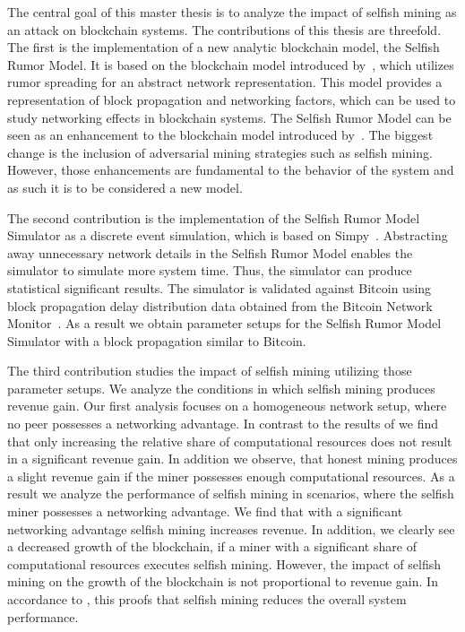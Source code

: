 The central goal of this master thesis is to analyze the impact of selfish mining as an attack on blockchain systems. The contributions of this thesis are threefold. The first is the implementation of a new analytic blockchain model, the Selfish Rumor Model. It is based on the blockchain model introduced by~, which utilizes rumor spreading for an abstract network representation. This model provides a representation of block propagation and networking factors, which can be used to study networking effects in blockchain systems. The Selfish Rumor Model can be seen as an enhancement to the blockchain model introduced by~. The biggest change is the inclusion of adversarial mining strategies such as selfish mining. However, those enhancements are fundamental to the behavior of the system and as such it is to be considered a new model.

The second contribution is the implementation of the Selfish Rumor Model Simulator as a discrete event simulation, which is based on Simpy~\cite{simpy}.
Abstracting away unnecessary network details in the Selfish Rumor Model enables the simulator to simulate more system time. Thus, the simulator can produce statistical significant results. The simulator is validated against Bitcoin using block propagation delay distribution data obtained from the Bitcoin Network Monitor~\cite{BitcoinNetworkMonitor}. As a result we obtain parameter setups for the Selfish Rumor Model Simulator with a block propagation similar to Bitcoin.

The third contribution studies the impact of selfish mining utilizing those parameter setups. We analyze the conditions in which selfish mining produces revenue gain. Our first analysis focuses on a homogeneous network setup, where no peer possesses a networking advantage. In contrast to the results of \citeauthor{eyal} we find that only increasing the relative share of computational resources does not result in a significant revenue gain. In addition we observe, that honest mining produces a slight revenue gain if the miner possesses enough computational resources.
As a result we analyze the performance of selfish mining in scenarios, where the selfish miner possesses a networking advantage. We find that with a significant networking advantage selfish mining increases revenue.
In addition, we clearly see a decreased growth of the blockchain, if a miner with a significant share of computational resources executes selfish mining. However, the impact of selfish mining on the growth of the blockchain is not proportional to revenue gain. In accordance to \citeauthor{eyal}, this proofs that selfish mining reduces the overall system performance.





